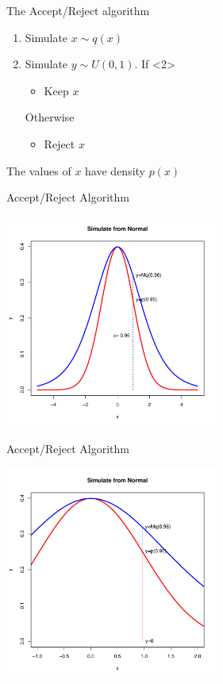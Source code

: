 \documentclass
[handout]
{beamer}
\begin{document}
\begin{frame}{The Accept/Reject algorithm}
\begin{enumerate}
\item Simulate $x\sim q(x)$ 
\item Simulate $y\sim U(0,1)$. If <2>
\begin{itemize}
\item Keep $x$ 
\end{itemize}
Otherwise
\begin{itemize}
\item Reject $x$ 
\end{itemize}
\end{enumerate}
The values of $x$ have density $p(x)$
\end{frame}
\begin{frame}{Accept/Reject Algorithm}
\begin{center}
\includegraphics[height=7cm]{./Pics/nmlg4.pdf}
\end{center}
\end{frame}
\begin{frame}{Accept/Reject Algorithm}
\begin{center}
\includegraphics[height=7cm]{./Pics/nmlg5.pdf}
\end{center}
\end{frame}
\end{document}
